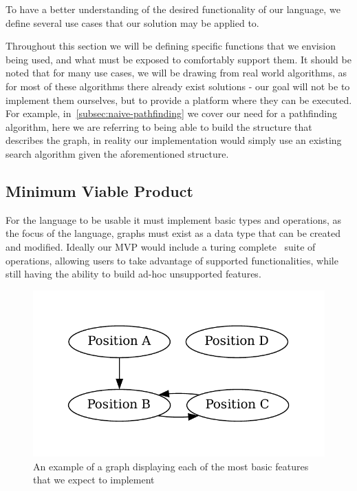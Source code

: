 To have a better understanding of the desired functionality of our language, we define several use cases that our
solution may be applied to.

Throughout this section we will be defining specific functions that we envision being used, and what must be exposed to
comfortably support them.
It should be noted that for many use cases, we will be drawing from real world algorithms, as for most of these
algorithms there already exist solutions - our goal will not be to implement them ourselves, but to provide a platform
where they can be executed.
For example, in~\ref{subsec:naive-pathfinding} we cover our need for a pathfinding algorithm, here we are referring to
being able to build the structure that describes the graph, in reality our implementation would simply use an
existing search algorithm given the aforementioned structure.

\subsection{Minimum Viable Product}\label{subsec:minimum-viable-product}
For the language to be usable it must implement basic types and operations, as the focus of the language, graphs must
exist as a data type that can be created and modified.
Ideally our MVP would include a turing complete~\cite{TuringCompleteness} suite of operations, allowing users to take
advantage of supported functionalities, while still having the ability to build ad-hoc unsupported features.

\begin{figure}[H]
    \centering
    \includegraphics[width=12cm]{figures/example_graphs/basics.gv}
    \caption{An example of a graph displaying each of the most basic features that we expect to implement}
    \label{fig:example_basic_graph}
\end{figure}

